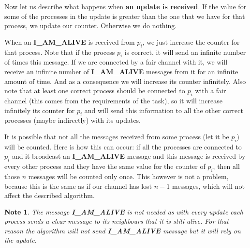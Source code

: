 \documentclass[12pt]{article}
\theoremstyle{plain}
\begin{document}
\begin{itemize}
    Now let us describe what happens when \textbf{an update is received}. If the
    value for some of the processes in the update is greater than the one that
    we have for that process, we update our counter. Otherwise we do nothing.

    When an \textbf{I\_AM\_ALIVE} is received from $p_i$, we just increase the
    counter for that process. Note that if the process $p_i$ is correct, 
    it will send an infinite number of times this message. If we are connected
    by a fair channel with it, we will receive an infinite number of
    \textbf{I\_AM\_ALIVE} messages from it for an infinite amount of time.
    And as a consequence we will increase its counter infinitely. Also note that
    at least one correct process should be connected to $p_i$ with a fair
    channel (this comes from the requirements of the task), so it will increase
    infinitely its counter for $p_i$ and will send this information to all the
    other correct processes (maybe indirectly) with its updates.

    It is possible that not all the messages received from some process (let it
    be $p_i$) will be counted. Here is how this can occur: if all the processes
    are connected to $p_i$ and it broadcast an \textbf{I\_AM\_ALIVE} message
    and this message is received by every other process and they have the same
    value for the counter of $p_i$, then all those $n$ messages will be counted
    only once. This however is not a problem, because this is the same as if
    our channel has lost $n - 1$ messages, which will not affect the described
    algorithm.
\end{itemize}

\newtheorem*{note1}{Note}
\begin{note1}
  The message \textbf{I\_AM\_ALIVE} is not needed as with every update each
  process sends a clear message to its neighbours that it is still alive. For
  that reason the algorithm will not send \textbf{I\_AM\_ALIVE} message but
  it will rely on the update. 
\end{note1}
\end{document}
